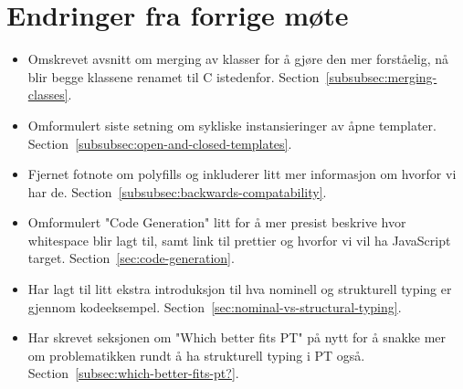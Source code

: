 
\chapter*{Endringer fra forrige møte}

\begin{itemize}
    \item Omskrevet avsnitt om merging av klasser for å gjøre den mer forståelig, nå blir begge klassene renamet til C istedenfor.
    Section~\vref{subsubsec:merging-classes}.
    \item Omformulert siste setning om sykliske instansieringer av åpne templater.
    Section~\vref{subsubsec:open-and-closed-templates}.
    \item Fjernet fotnote om polyfills og inkluderer litt mer informasjon om hvorfor vi har de.
    Section~\vref{subsubsec:backwards-compatability}.
    \item Omformulert "Code Generation" litt for å mer presist beskrive hvor whitespace blir lagt til, samt link til prettier og hvorfor vi vil ha JavaScript target.
    Section~\vref{sec:code-generation}.
    \item Har lagt til litt ekstra introduksjon til hva nominell og strukturell typing er gjennom kodeeksempel.
    Section~\vref{sec:nominal-vs-structural-typing}.
    \item Har skrevet seksjonen om "Which better fits PT" på nytt for å snakke mer om problematikken rundt å ha strukturell typing i PT også.
    Section~\vref{subsec:which-better-fits-pt?}.

\end{itemize}

